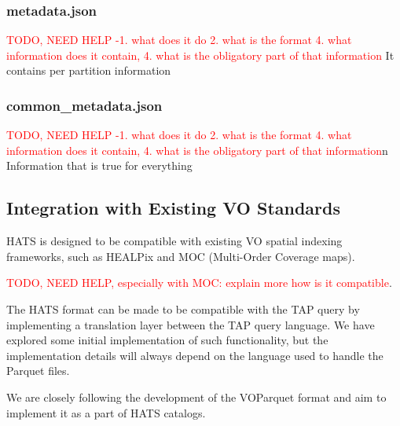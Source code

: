 \documentclass[11pt,a4paper]{ivoa}
\begin{document}
    
        \subsubsection{metadata.json} 
   \textcolor{red}{TODO, NEED HELP -1. what does it do 2. what is the format 4. what information does it contain, 4. what is the obligatory part of that information}
    It contains per partition information
        \subsubsection{common\_metadata.json} 
   \textcolor{red}{TODO, NEED HELP -1. what does it do 2. what is the format 4. what information does it contain, 4. what is the obligatory part of that information}n
    Information that is true for everything 

    \subsection{Integration with Existing VO Standards}
    HATS is designed to be compatible with existing VO spatial indexing frameworks, such as HEALPix and MOC (Multi-Order Coverage maps). \par
   \textcolor{red}{TODO, NEED HELP, especially with MOC: explain more how is it compatible}. \par 
   The HATS format can be made to be compatible with the TAP query by implementing a translation layer between the TAP query language. We have explored some initial implementation of such functionality, but the implementation details will always depend on the language used to handle the Parquet files. \par
  We are closely following the development of the VOParquet format and aim to implement it as a part of HATS catalogs.
\end{document}
